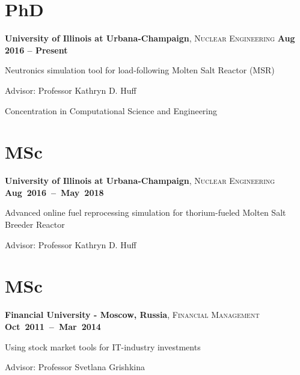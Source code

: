 \documentclass[margin,line]{resume}
\begin{document}
\begin{resume}
    \section{\mysidestyle PhD}
    \textbf{University of Illinois at Urbana-Champaign}, \textsc{Nuclear Engineering}\hfill \textbf{ Aug 2016 -- Present}\vspace{-3mm}\\\vspace{-1mm}%
    \begin{list2}
        \item Neutronics simulation tool for load-following Molten Salt Reactor (MSR)
        \item Advisor:  Professor Kathryn D. Huff
        \item Concentration in Computational Science and Engineering
    \end{list2}\vspace{-1.5mm}
    \section{\mysidestyle MSc}
    \textbf{University of Illinois at Urbana-Champaign}, \textsc{Nuclear Engineering} \hfill\textbf{\mbox{Aug 2016 -- May 2018}}\vspace{-3mm}\\\vspace{-1mm}%
    \begin{list2}
        \item Advanced online fuel reprocessing simulation for thorium-fueled Molten Salt Breeder Reactor
        \item Advisor:  Professor Kathryn D. Huff
    \end{list2}\vspace{-1.5mm}
    \section{\mysidestyle MSc}
    \textbf{Financial University - Moscow, Russia}, \textsc{Financial Management} \hfill \textbf{\mbox{Oct 2011 -- Mar 2014	}}\vspace{-3mm}\\\vspace{-1mm}%
    \begin{list2}
        \item Using stock market tools for IT-industry investments
        \item Advisor:  Professor Svetlana Grishkina
    \end{list2}\vspace{-1.5mm}

\end{resume}
\end{document}
